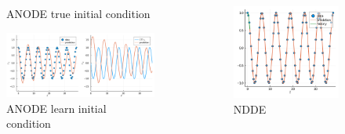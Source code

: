 \documentclass[11pt,aspectratio=169]{beamer}
\begin{document}
\begin{frame}[t]
\begin{columns}
\begin{column}{0.5\textwidth}
\begin{figure}
                \caption{ANODE true initial condition}
            \end{figure}
            \vspace{-0.7cm}
            \begin{figure}
                \centering
                \includegraphics[width=0.9\columnwidth]{figures/anode_learn_init.png}
                \caption{ANODE learn initial condition}
            \end{figure}
        \end{column}
        \begin{column}{0.25\textwidth}
            \begin{figure}
                \centering
                \includegraphics[width=\columnwidth]{figures/ndde.png}
                \caption{NDDE}
            \end{figure}
        \end{column}
    \end{columns}
\end{frame}
\end{document}
